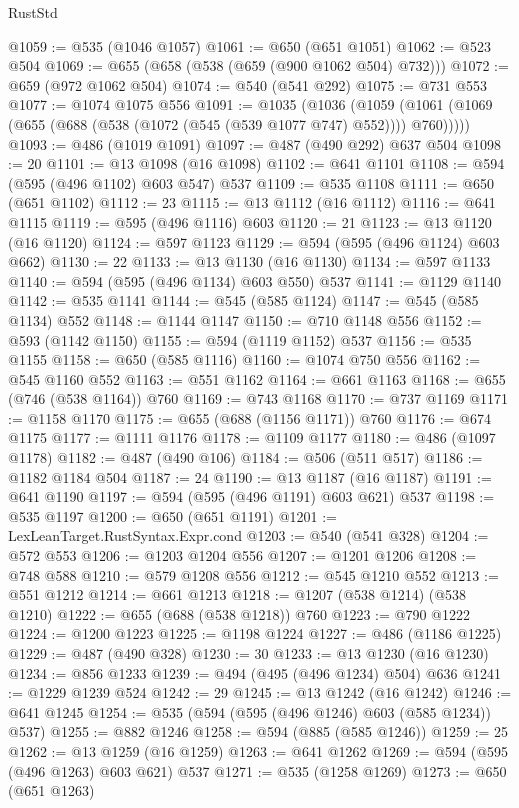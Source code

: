 \begin{lexlean}{RustStd}
\begin{coremodule}
@1059 := @535 (@1046 @1057)
@1061 := @650 (@651 @1051)
@1062 := @523 @504
@1069 := @655 (@658 (@538 (@659 (@900 @1062 @504) @732)))
@1072 := @659 (@972 @1062 @504)
@1074 := @540 (@541 @292)
@1075 := @731 @553
@1077 := @1074 @1075 @556
@1091 := @1035
    (@1036 (@1059 (@1061 (@1069 (@655 (@688 (@538 (@1072 (@545 (@539 @1077 @747) @552)))) @760)))))
@1093 := @486 (@1019 @1091)
@1097 := @487 (@490 @292) @637 @504
@1098 := 20
@1101 := @13 @1098 (@16 @1098)
@1102 := @641 @1101
@1108 := @594 (@595 (@496 @1102) @603 @547) @537
@1109 := @535 @1108
@1111 := @650 (@651 @1102)
@1112 := 23
@1115 := @13 @1112 (@16 @1112)
@1116 := @641 @1115
@1119 := @595 (@496 @1116) @603
@1120 := 21
@1123 := @13 @1120 (@16 @1120)
@1124 := @597 @1123
@1129 := @594 (@595 (@496 @1124) @603 @662)
@1130 := 22
@1133 := @13 @1130 (@16 @1130)
@1134 := @597 @1133
@1140 := @594 (@595 (@496 @1134) @603 @550) @537
@1141 := @1129 @1140
@1142 := @535 @1141
@1144 := @545 (@585 @1124)
@1147 := @545 (@585 @1134) @552
@1148 := @1144 @1147
@1150 := @710 @1148 @556
@1152 := @593 (@1142 @1150)
@1155 := @594 (@1119 @1152) @537
@1156 := @535 @1155
@1158 := @650 (@585 @1116)
@1160 := @1074 @750 @556
@1162 := @545 @1160 @552
@1163 := @551 @1162
@1164 := @661 @1163
@1168 := @655 (@746 (@538 @1164)) @760
@1169 := @743 @1168
@1170 := @737 @1169
@1171 := @1158 @1170
@1175 := @655 (@688 (@1156 @1171)) @760
@1176 := @674 @1175
@1177 := @1111 @1176
@1178 := @1109 @1177
@1180 := @486 (@1097 @1178)
@1182 := @487 (@490 @106)
@1184 := @506 (@511 @517)
@1186 := @1182 @1184 @504
@1187 := 24
@1190 := @13 @1187 (@16 @1187)
@1191 := @641 @1190
@1197 := @594 (@595 (@496 @1191) @603 @621) @537
@1198 := @535 @1197
@1200 := @650 (@651 @1191)
@1201 := LexLeanTarget.RustSyntax.Expr.cond
@1203 := @540 (@541 @328)
@1204 := @572 @553
@1206 := @1203 @1204 @556
@1207 := @1201 @1206
@1208 := @748 @588
@1210 := @579 @1208 @556
@1212 := @545 @1210 @552
@1213 := @551 @1212
@1214 := @661 @1213
@1218 := @1207 (@538 @1214) (@538 @1210)
@1222 := @655 (@688 (@538 @1218)) @760
@1223 := @790 @1222
@1224 := @1200 @1223
@1225 := @1198 @1224
@1227 := @486 (@1186 @1225)
@1229 := @487 (@490 @328)
@1230 := 30
@1233 := @13 @1230 (@16 @1230)
@1234 := @856 @1233
@1239 := @494 (@495 (@496 @1234) @504) @636
@1241 := @1229 @1239 @524
@1242 := 29
@1245 := @13 @1242 (@16 @1242)
@1246 := @641 @1245
@1254 := @535 (@594 (@595 (@496 @1246) @603 (@585 @1234)) @537)
@1255 := @882 @1246
@1258 := @594 (@885 (@585 @1246))
@1259 := 25
@1262 := @13 @1259 (@16 @1259)
@1263 := @641 @1262
@1269 := @594 (@595 (@496 @1263) @603 @621) @537
@1271 := @535 (@1258 @1269)
@1273 := @650 (@651 @1263)

\end{coremodule}
\end{lexlean}
